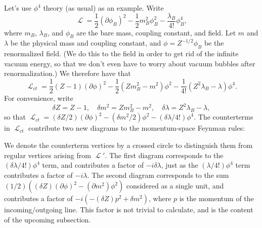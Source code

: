 \documentclass{report}
\theoremstyle{plain}
\theoremstyle{definition}
\theoremstyle{remark}
\DeclareMathOperator{\cL}{\mathcal{L}}
\begin{document}
Let's use $\phi^4$ theory (as usual) as an example. Write
$$ \cL = \frac{1}{2} (\partial \phi_B)^2 - \frac{1}{2} m_B^2 \phi_B^2 - \frac{\lambda_B}{4!} \phi_B^4, $$
where $m_B$, $\lambda_B$, and $\phi_B$ are the bare mass, coupling
constant, and field. Let $m$ and $\lambda$ be the physical mass and
coupling constant, and $\phi = Z^{-1/2}\phi_B$ be the renormalized
field. (We do this to the field in order to get rid of the infinite
vacuum energy, so that we don't even have to worry about vacuum
bubbles after renormalization.) We therefore have that
$$ \cL_{ct} = \frac{1}{2} (Z-1) (\partial\phi)^2 - \frac{1}{2}(Zm_B^2 - m^2) \phi^2 - \frac{1}{4!} (Z^2 \lambda_B - \lambda) \phi^4. $$
For convenience, write
$$ \delta Z = Z - 1, \quad \delta m^2 = Zm_B^2 - m^2, \quad \delta \lambda = Z^2 \lambda_B - \lambda, $$
so that
$\cL_{ct} = (\delta Z/2)(\partial\phi)^2 - (\delta m^2/2) \phi^2 -
(\delta\lambda/4!)\phi^4$.
The counterterms in $\cL_{ct}$ contribute two new diagrams to the
momentum-space Feynman rules:
\begin{center}
  \begin{minipage}{0.45\textwidth}
    \centering
  \end{minipage}
  \begin{minipage}{0.45\textwidth}
    \centering
  \end{minipage}
\end{center}
We denote the counterterm vertices by a crossed circle to distinguish
them from regular vertices arising from $\cL'$. The first diagram
corresponds to the $(\delta\lambda/4!)\phi^4$ term, and contributes a
factor of $-i\delta\lambda$, just as the $(\lambda/4!)\phi^4$ term
contributes a factor of $-i\lambda$. The second diagram corresponds to
the sum $(1/2)((\delta Z)(\partial\phi)^2 - (\partial m^2)\phi^2)$
considered as a single unit, and contributes a factor of
$-i(-(\delta Z)p^2 + \delta m^2)$, where $p$ is the momentum of the
incoming/outgoing line. This factor is not trivial to calculate, and
is the content of the upcoming subsection.
\end{document}
